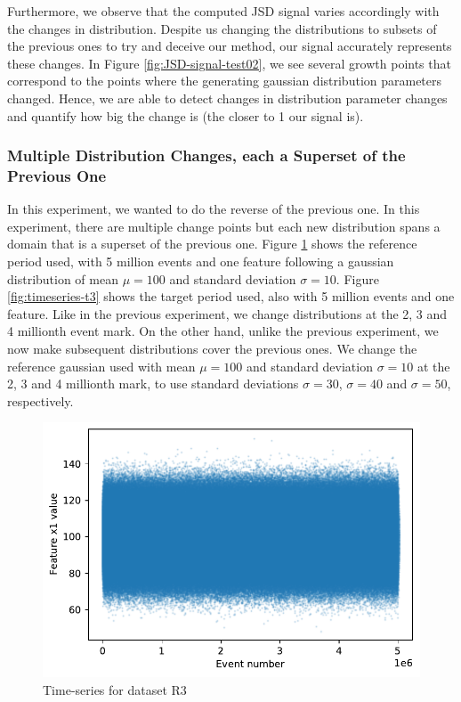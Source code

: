 \documentclass[sigconf]{acmart}
\begin{document}
Furthermore, we observe that the computed JSD signal varies accordingly with the changes in distribution. Despite us changing the distributions to subsets of the previous ones to try and deceive our method, our signal accurately represents these changes. In Figure \ref{fig:JSD-signal-test02}, we see several growth points that correspond to the points where the generating gaussian distribution parameters changed. Hence, we are able to detect changes in distribution parameter changes and quantify how big the change is (the closer to 1 our signal is).

\subsubsection{Multiple Distribution Changes, each a Superset of the Previous One}
In this experiment, we wanted to do the reverse of the previous one. In this experiment, there are multiple change points but each new distribution spans a domain that is a superset of the previous one. Figure \ref{fig:timeseries-r3} shows the reference period used, with 5 million events and one feature following a gaussian distribution of mean $\mu=100$ and standard deviation $\sigma=10$. Figure \ref{fig:timeseries-t3} shows the target period used, also with 5 million events and one feature. Like in the previous experiment, we change distributions at the 2, 3 and 4 millionth event mark. On the other hand, unlike the previous experiment, we now make subsequent distributions cover the previous ones. We change the reference gaussian used with mean $\mu=100$ and standard deviation $\sigma=10$ at the 2, 3 and 4 millionth mark, to use standard deviations $\sigma=30$, $\sigma=40$ and $\sigma=50$, respectively.
\begin{figure}[!htb]
    \begin{center}
      \includegraphics[scale=0.5]{figures/timeseries-r3.pdf}
      \caption{Time-series for dataset R3}
      \label{fig:timeseries-r3}
    \end{center}
\end{figure}
\end{document}
